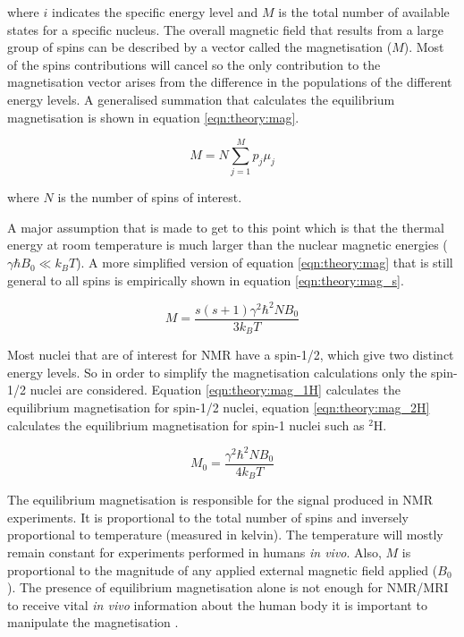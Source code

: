 \noindent where $i$ indicates the specific energy level and $M$ is the total number of available states for a specific nucleus. The overall magnetic field that results from a large group of spins can be described by a vector called the magnetisation ($M$). Most of the spins contributions will cancel so the only contribution to the magnetisation vector arises from the difference in the populations of the different energy levels. A generalised summation that calculates the equilibrium magnetisation is shown in equation \ref{eqn:theory:mag}.

\begin{equation}
    M = N\sum_{j = 1}^{M}p_j\mu_j
    \label{eqn:theory:mag}
\end{equation}

\noindent where $N$ is the number of spins of interest. 

A major assumption that is made to get to this point which is that the thermal energy at room temperature is much larger than the nuclear magnetic energies ($\gamma \hbar B_0\ll k_BT$). A more simplified version of equation \ref{eqn:theory:mag} that is still general to all spins is empirically shown in equation \ref{eqn:theory:mag_s}.

\begin{equation}
    M = \frac{s(s+1)\gamma^2 \hbar^2 N B_0}{3k_BT}
    \label{eqn:theory:mag_s}
\end{equation}

\noindent Most nuclei that are of interest for \ac{NMR} have a spin-1/2, which give two distinct energy levels. So in order to simplify the magnetisation calculations only the spin-1/2 nuclei are considered. Equation \ref{eqn:theory:mag_1H} calculates the equilibrium magnetisation for spin-1/2 nuclei, equation \ref{eqn:theory:mag_2H} calculates the equilibrium magnetisation for spin-1 nuclei such as $^2$H.

\begin{equation}
    M_0 = \frac{\gamma^2 \hbar^2 N B_0}{4k_BT}
    \label{eqn:theory:mag_1H}
\end{equation}

The equilibrium magnetisation is responsible for the signal produced in \ac{NMR} experiments. It is proportional to the total number of spins and inversely proportional to temperature (measured in kelvin). The temperature will mostly remain constant for experiments performed in humans \textit{in vivo}. Also, $M$ is proportional to the magnitude of any applied external magnetic field applied ($B_0$). The presence of equilibrium magnetisation alone is not enough for \ac{NMR}/\ac{MRI} to receive vital \textit{in vivo} information about the human body it is important to manipulate the magnetisation \cite{Haacke2014MagneticDesign}. 

